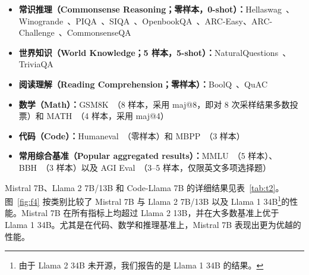 \documentclass[a4paper,11pt]{article}
\providecommand{\bipar}[2]{#2}
\providecommand{\biitem}[2]{\item #2}
\providecommand{\bifoot}[2]{\footnote{#2}}
\begin{document}
\begin{itemize}
\biitem{\textbf{Commonsense Reasoning (0-shot):} Hellaswag \cite{ref28}, Winogrande \cite{ref21}, PIQA \cite{ref4}, SIQA \cite{ref22}, OpenbookQA \cite{ref19}, ARC-Easy, ARC-Challenge \cite{ref9}, CommonsenseQA \cite{ref24}}{\textbf{常识推理（Commonsense Reasoning；零样本，0-shot）：}Hellaswag~\cite{ref28}、Winogrande~\cite{ref21}、PIQA~\cite{ref4}、SIQA~\cite{ref22}、OpenbookQA~\cite{ref19}、ARC-Easy、ARC-Challenge~\cite{ref9}、CommonsenseQA~\cite{ref24}}
\biitem{\textbf{World Knowledge (5-shot):} NaturalQuestions \cite{ref16}, TriviaQA \cite{ref15}}{\textbf{世界知识（World Knowledge；5 样本，5-shot）：}NaturalQuestions~\cite{ref16}、TriviaQA~\cite{ref15}}
\biitem{\textbf{Reading Comprehension (0-shot):} BoolQ \cite{ref8}, QuAC \cite{ref7}}{\textbf{阅读理解（Reading Comprehension；零样本）：}BoolQ~\cite{ref8}、QuAC~\cite{ref7}}
\biitem{\textbf{Math:} GSM8K \cite{ref10} (8-shot) with maj@8 and MATH \cite{ref13} (4-shot) with maj@4}{\textbf{数学（Math）：}GSM8K~\cite{ref10}（8 样本，采用 maj@8，即对 8 次采样结果多数投票）和 MATH~\cite{ref13}（4 样本，采用 maj@4）}
\biitem{\textbf{Code:} Humaneval \cite{ref5} (0-shot) and MBPP \cite{ref2} (3-shot)}{\textbf{代码（Code）：}Humaneval~\cite{ref5}（零样本）和 MBPP~\cite{ref2}（3 样本）}
\biitem{\textbf{Popular aggregated results:} MMLU \cite{ref12} (5-shot), BBH \cite{ref23} (3-shot), and AGI Eval \cite{ref29} (3-5-shot, English multiple-choice questions only)}{\textbf{常用综合基准（Popular aggregated results）：}MMLU~\cite{ref12}（5 样本）、BBH~\cite{ref23}（3 样本）以及 AGI Eval~\cite{ref29}（3--5 样本，仅限英文多项选择题）}
\end{itemize}

\bipar{Detailed results for Mistral 7B, Llama 2 7B/13B, and Code-Llama 7B are reported in Table~\ref{tab:t2}. Figure~\ref{fig:f4} compares the performance of Mistral 7B with Llama 2 7B/13B, and Llama 1 34B in different categories. Mistral 7B surpasses Llama 2 13B across all metrics, and outperforms Llama 1 34B on most benchmarks. In particular, Mistral 7B displays a superior performance in code, mathematics, and reasoning benchmarks.}{Mistral 7B、Llama 2 7B/13B 和 Code-Llama 7B 的详细结果见表~\ref{tab:t2}。图~\ref{fig:f4} 按类别比较了 Mistral 7B 与 Llama 2 7B/13B 以及 Llama 1 34B\bifoot{Since Llama 2 34B was not open-sourced, we report results for Llama 1 34B.}{由于 Llama 2 34B 未开源，我们报告的是 Llama 1 34B 的结果。}的性能。Mistral 7B 在所有指标上均超过 Llama 2 13B，并在大多数基准上优于 Llama 1 34B。尤其是在代码、数学和推理基准上，Mistral 7B 表现出更为优越的性能。}
\end{document}
